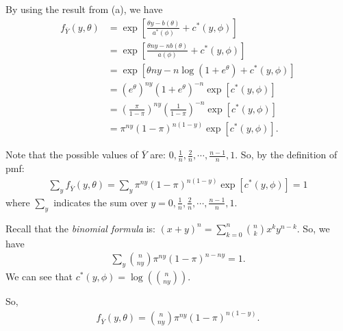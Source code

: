 By using the result from (a), we have
\begin{align*}
f_{\overline{Y}}(y,\theta) &= \exp\left[\frac{\theta y - b(\theta)}{a^{*}(\phi)} + c^{*}(y,\phi)\right]\\
&= \exp\left[\frac{\theta ny - n b(\theta)}{a(\phi)} +c^{*}(y,\phi)\right]\\
&= \exp\left[\theta ny -n\log(1+e^{\theta}) +c^{*}(y,\phi)\right]\\
&= \left(e^{\theta}\right)^{ny}\left(1+e^{\theta}\right)^{-n}\exp\left[c^{*}(y,\phi)\right]\\
&= \left(\frac{\pi}{1-\pi}\right)^{ny}\left(\frac{1}{1-\pi}\right)^{-n}\exp\left[c^{*}(y,\phi)\right]\\
&= \pi^{ny}(1-\pi)^{n(1-y)} \exp\left[c^{*}(y,\phi)\right].
\end{align*}

Note that the possible values of $\overline{Y}$ are: $0, \frac{1}{n}, \frac{2}{n}, \cdots ,\frac{n-1}{n}, 1$. So, by the definition of pmf:
\begin{align*}
\sum_{y} f_{\overline{Y}}(y,\theta) = \sum_{y} \pi^{ny}(1-\pi)^{n(1-y)}\exp\left[c^{*}(y,\phi)\right] = 1
\end{align*}
where $\sum_{y}$ indicates the sum over $y = 0, \frac{1}{n}, \frac{2}{n}, \cdots ,\frac{n-1}{n}, 1$.

Recall that the \textit{binomial formula} is: $(x+y)^{n}=\sum_{k=0}^{n}\binom{n}{k}x^{k}y^{n-k}$.
So, we have
\begin{align*}
\sum_{y} \binom{n}{ny}\pi^{ny}(1-\pi)^{n-ny} = 1.
\end{align*}
We can see that $c^{*}(y,\phi) = \log\left(\binom{n}{ny}\right)$.

So, 
\begin{align*}
f_{\overline{Y}}(y,\theta) = \binom{n}{ny}\pi^{ny}(1-\pi)^{n(1-y)}.
\end{align*}
